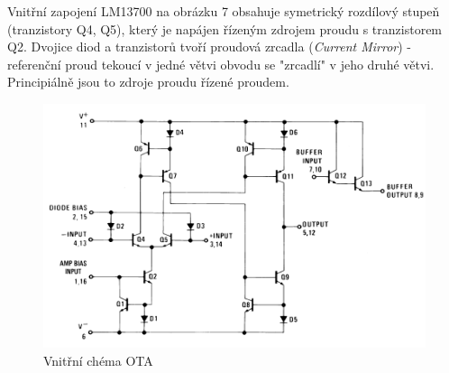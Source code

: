 \documentclass[twoside]{article}
\begin{document}
\noindent Vnitřní zapojení LM13700 na obrázku 7 obsahuje symetrický rozdílový stupeň (tranzistory Q4, Q5), který je napájen řízeným zdrojem proudu s tranzistorem Q2. Dvojice diod a tranzistorů tvoří proudová zrcadla (\textit{Current Mirror}) - referenční proud tekoucí v jedné větvi obvodu se "zrcadlí" v jeho druhé větvi. Principiálně jsou to zdroje proudu řízené proudem. 
\begin{figure}[H]
\centering
\includegraphics[scale=0.8]{image5.png}
\caption{Vnitřní chéma OTA \cite{6}}
\end{figure}
\end{document}
